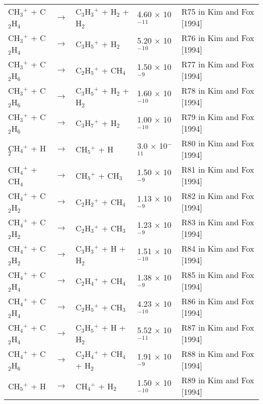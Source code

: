 \documentclass[10pt,a4paper]{jarticle}
\begin{document}
\begin{table}[htb]
{\begin{tabular}{lclll}
 CH$_3$$^+$  + C$_2$H$_4$     & $\rightarrow$ & C$_3$H$_3$$^+$ + H$_2$  +  H$_2$     & 4.60 $\times$ 10$^-$$^1$$^1$ & R75 in Kim and Fox [1994] \\
 CH$_3$$^+$  + C$_2$H$_4$     & $\rightarrow$ & C$_3$H$_5$$^+$ + H$_2$            & 5.20 $\times$ 10$^-$$^1$$^0$ & R76 in Kim and Fox [1994] \\
 CH$_3$$^+$  + C$_2$H$_6$     & $\rightarrow$ & C$_2$H$_5$$^+$ + CH$_4$           & 1.50 $\times$ 10$^-$$^9$ & R77 in Kim and Fox [1994] \\
 CH$_3$$^+$  + C$_2$H$_6$     & $\rightarrow$ & C$_3$H$_5$$^+$ + H$_2$  +  H$_2$     & 1.60 $\times$ 10$^-$$^1$$^0$ & R78 in Kim and Fox [1994] \\
 CH$_3$$^+$  + C$_2$H$_6$     & $\rightarrow$ & C$_3$H$_7$$^+$ + H$_2$            & 1.00 $\times$ 10$^-$$^1$$^0$ & R79 in Kim and Fox [1994] \\
 CH$_4$$^+$  + H$_2$       & $\rightarrow$ & CH$_5$$^+$  + H             & 3.0 $\times$ 10$^-$$^1$$^1$ & R80 in Kim and Fox [1994] \\
 CH$_4$$^+$  + CH$_4$      & $\rightarrow$ & CH$_5$$^+$  + CH$_3$           & 1.50 $\times$ 10$^-$$^9$ & R81 in Kim and Fox [1994] \\
 CH$_4$$^+$  + C$_2$H$_2$     & $\rightarrow$ & C$_2$H$_2$$^+$ + CH$_4$           & 1.13 $\times$ 10$^-$$^9$ & R82 in Kim and Fox [1994] \\
 CH$_4$$^+$  + C$_2$H$_2$     & $\rightarrow$ & C$_2$H$_3$$^+$ + CH$_3$           & 1.23 $\times$ 10$^-$$^9$ & R83 in Kim and Fox [1994] \\
 CH$_4$$^+$  + C$_2$H$_2$     & $\rightarrow$ & C$_3$H$_3$$^+$ + H   +  H$_2$     & 1.51 $\times$ 10$^-$$^1$$^0$ & R84 in Kim and Fox [1994] \\
 CH$_4$$^+$  + C$_2$H$_4$     & $\rightarrow$ & C$_2$H$_4$$^+$ + CH$_4$           & 1.38 $\times$ 10$^-$$^9$ & R85 in Kim and Fox [1994] \\
 CH$_4$$^+$  + C$_2$H$_4$     & $\rightarrow$ & C$_2$H$_5$$^+$ + CH$_3$           & 4.23 $\times$ 10$^-$$^1$$^0$ & R86 in Kim and Fox [1994] \\
 CH$_4$$^+$  + C$_2$H$_4$     & $\rightarrow$ & C$_3$H$_5$$^+$ + H   +  H$_2$     & 5.52 $\times$ 10$^-$$^1$$^1$ & R87 in Kim and Fox [1994] \\
 CH$_4$$^+$  + C$_2$H$_6$     & $\rightarrow$ & C$_2$H$_4$$^+$ + CH$_4$ +  H$_2$     & 1.91 $\times$ 10$^-$$^9$ & R88 in Kim and Fox [1994] \\
 CH$_5$$^+$  + H        & $\rightarrow$ & CH$_4$$^+$  + H$_2$            & 1.50 $\times$ 10$^-$$^1$$^0$ & R89 in Kim and Fox [1994] \\

\end{tabular}}
\end{table}
\end{document}
